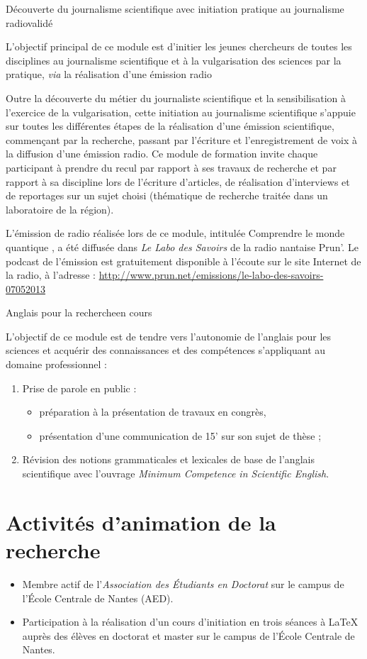 \formation
{Découverte du journalisme scientifique avec initiation pratique au journalisme radio}{validé}
{L'objectif principal de ce module est d'initier les jeunes chercheurs de toutes les disciplines au journalisme scientifique et à la vulgarisation des sciences par la pratique, \textit{via} la réalisation d'une émission radio

Outre la découverte du métier du journaliste scientifique et la sensibilisation à l'exercice de la vulgarisation, cette initiation au journalisme scientifique s'appuie sur toutes les différentes étapes de la réalisation d'une émission scientifique, commençant par la recherche, passant par l'écriture et l'enregistrement de voix à la diffusion d'une émission radio. Ce module de formation invite chaque participant à prendre du recul par rapport à ses travaux de recherche et par rapport à sa discipline lors de l'écriture d'articles, de réalisation d'interviews et de reportages sur un sujet choisi (thématique de recherche traitée dans un laboratoire de la région).

L'émission de radio réalisée lors de ce module, intitulée \og Comprendre le monde quantique \fg, a été diffusée dans \textit{Le Labo des Savoirs} de la radio nantaise Prun'.
Le podcast de l'émission est gratuitement disponible à l'écoute sur le site Internet de la radio,
à l'adresse : \url{http://www.prun.net/emissions/le-labo-des-savoirs-07052013}}

\formation
{Anglais pour la recherche}{en cours}
{L'objectif de ce module est de tendre vers l'autonomie de l'anglais pour les sciences et acquérir des connaissances et des compétences s'appliquant au domaine professionnel :
\begin{enumerate}
  \item Prise de parole en public :
  \begin{itemize}
    \item préparation à la présentation de travaux en congrès,
    \item présentation d'une communication de 15' sur son sujet de thèse ;
  \end{itemize}
  \item Révision des notions grammaticales et lexicales de base de l'anglais scientifique avec l'ouvrage \textit{Minimum Competence in Scientific English}.
\end{enumerate}}



\section{Activités d'animation de la recherche}
\begin{itemize}
\renewcommand{\labelitemi}{\qquad$\bullet$}
  \item Membre actif de l'\emph{Association des Étudiants en Doctorat} sur le campus de l'École Centrale de Nantes (AED).
  \item Participation à la réalisation d'un cours d'initiation en trois séances à \LaTeX{} auprès des élèves en doctorat et master sur le campus de l'École Centrale de Nantes.
\end{itemize}
